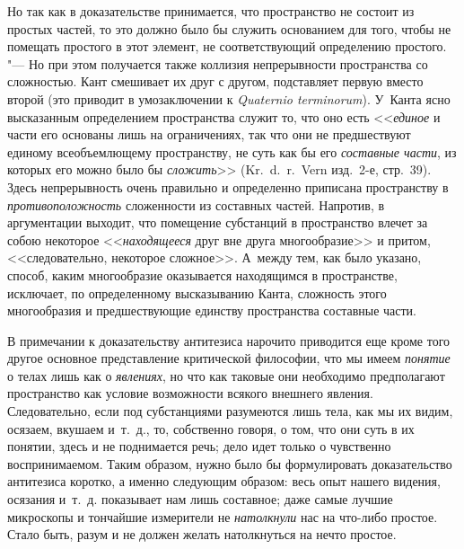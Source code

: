 Но так как в доказательстве принимается, что пространство не состоит из
простых частей, то это должно было бы служить основанием для того, чтобы не
помещать простого в этот элемент, не соответствующий определению простого.
"--- Но при этом получается также коллизия непрерывности пространства со
сложностью. Кант смешивает их друг с другом, подставляет первую вместо
второй (это приводит в умозаключении к {\em Quaternio
terminorum}). У~Канта ясно высказанным определением пространства служит то,
что оно есть <<{\em единое} и части его основаны лишь на
ограничениях, так что они не предшествуют единому всеобъемлющему
пространству, не суть как бы его {\em составные части},
из которых его можно было бы {\em сложить}>> (Kr.~d.~r.~Vern
изд.~2-е, стр.~39). Здесь непрерывность очень правильно и определенно
приписана пространству в {\em противоположность}
сложенности из составных частей. Напротив, в аргументации выходит, что
помещение субстанций в пространство влечет за собою некоторое
<<{\em находящееся} друг вне друга многообразие>> и
притом, <<следовательно, некоторое сложное>>. А~между тем, как было указано,
способ, каким многообразие оказывается находящимся в пространстве,
исключает, по определенному высказыванию Канта, сложность этого
многообразия и предшествующие единству пространства составные части.

В примечании к доказательству антитезиса нарочито приводится еще кроме того
другое основное представление критической философии, что мы имеем {\em понятие}
о телах лишь как о {\em явлениях}, но что как таковые они необходимо
предполагают пространство как условие возможности всякого внешнего явления.
Следовательно, если под субстанциями разумеются лишь тела, как мы их видим,
осязаем, вкушаем и~т.~д., то, собственно говоря, о том, что они суть в их
понятии, здесь и не поднимается речь; дело идет только о чувственно
воспринимаемом. Таким образом, нужно было бы формулировать доказательство
антитезиса коротко, а именно следующим образом: весь опыт нашего видения,
осязания и~т.~д. показывает нам лишь составное; даже самые лучшие микроскопы и
тончайшие измерители не {\em натолкнули} нас на что-либо простое. Стало быть,
разум и не должен желать натолкнуться на нечто простое.


